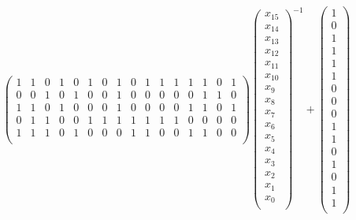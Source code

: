 \begin{align*}
\begin{pmatrix}
1 & 1 & 0 & 1 & 0 & 1 & 0 & 1 & 0 & 1 & 1 & 1 & 1 & 1 & 0 & 1 \\ 
0 & 0 & 1 & 0 & 1 & 0 & 0 & 1 & 0 & 0 & 0 & 0 & 0 & 1 & 1 & 0 \\ 
1 & 1 & 0 & 1 & 0 & 0 & 0 & 1 & 0 & 0 & 0 & 0 & 1 & 1 & 0 & 1 \\ 
0 & 1 & 1 & 0 & 0 & 1 & 1 & 1 & 1 & 1 & 1 & 1 & 0 & 0 & 0 & 0 \\ 
1 & 1 & 1 & 0 & 1 & 0 & 0 & 0 & 1 & 1 & 0 & 0 & 1 & 1 & 0 & 0 \\ 
\end{pmatrix}
\begin{pmatrix}
x_{15} \\
x_{14} \\
x_{13} \\
x_{12} \\
x_{11} \\
x_{10} \\
x_{9} \\
x_{8} \\
x_{7} \\
x_{6} \\
x_{5} \\
x_{4} \\
x_{3} \\
x_{2} \\
x_{1} \\
x_{0} \\
\end{pmatrix}^{-1}
+
\begin{pmatrix}
1 \\
0 \\
1 \\
1 \\
1 \\
1 \\
0 \\
0 \\
0 \\
1 \\
1 \\
0 \\
1 \\
0 \\
1 \\
1 \\
\end{pmatrix}
\end{align*}

